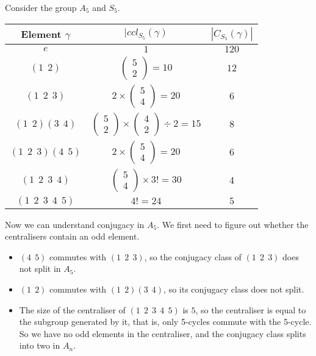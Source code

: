 \documentclass[../Main.tex]{subfiles}
\begin{document}
\begin{example}
    Consider the group $A_5$ and $S_5$.\par
    \begin{tabular}{c|c|c}
        Element $\gamma$ & $|ccl_{S_5}(\gamma)$ & $|C_{S_5}(\gamma)|$ \\
        \hline
        $e$ & $1$ & $120$ \\
        $(1~~2)$ & $\begin{pmatrix}5 \\ 2\end{pmatrix} = 10$ & $12$ \\
        $(1~~2~~3)$ & $2\times\begin{pmatrix}5 \\ 4\end{pmatrix} = 20$ & $6$ \\
        $(1~~2)(3~~4)$ & $\begin{pmatrix}5 \\ 2\end{pmatrix}\times\begin{pmatrix}4 \\ 2\end{pmatrix} \div 2 = 15$ & $8$ \\
        $(1~~2~~3)(4~~5)$ & $2\times\begin{pmatrix}5 \\ 4\end{pmatrix} = 20$ & $6$ \\
        $(1~~2~~3~~4)$ & $\begin{pmatrix}5 \\ 4\end{pmatrix}\times3! = 30$ & $4$ \\
        $(1~~2~~3~~4~~5)$ & $4! = 24$ & $5$
    \end{tabular}\par
    Now we can understand conjugacy in $A_5$. We first need to figure out whether the centralisers contain an odd element.\par
    \begin{itemize}
        \item $(4~~5)$ commutes with $(1~~2~~3)$, so the conjugacy class of $(1~~2~~3)$ does not split in $A_5$.
        \item $(1~~2)$ commutes with  $(1~~2)(3~~4)$, so its conjugacy class does not split.
        \item The size of the centraliser of $(1~~2~~3~~4~~5)$ is $5$, so the centraliser is equal to the subgroup generated by it, that is, only 5-cycles commute with the 5-cycle. So we have no odd elements in the centraliser, and the conjugacy class splits into two in $A_n$.

\end{itemize}
\end{example}
\end{document}
